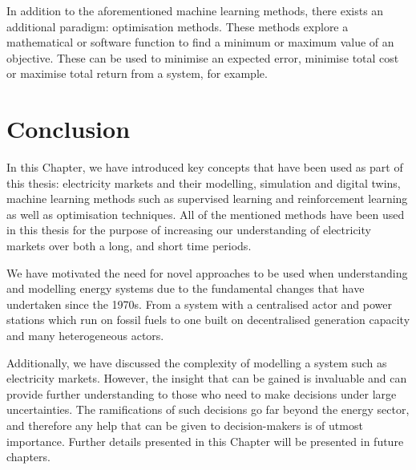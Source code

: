In addition to the aforementioned machine learning methods, there exists an additional paradigm: optimisation methods. These methods explore a mathematical or software function to find a minimum or maximum value of an objective. These can be used to minimise an expected error, minimise total cost or maximise total return from a system, for example.





\section{Conclusion}
\label{sec:intro:conclusion}

In this Chapter, we have introduced key concepts that have been used as part of this thesis: electricity markets and their modelling, simulation and digital twins, machine learning methods such as supervised learning and reinforcement learning as well as optimisation techniques. All of the mentioned methods have been used in this thesis for the purpose of increasing our understanding of electricity markets over both a long, and short time periods.

We have motivated the need for novel approaches to be used when understanding and modelling energy systems due to the fundamental changes that have undertaken since the 1970s. From a system with a centralised actor and power stations which run on fossil fuels to one built on decentralised generation capacity and many heterogeneous actors. 

Additionally, we have discussed the complexity of modelling a system such as electricity markets. However, the insight that can be gained is invaluable and can provide further understanding to those who need to make decisions under large uncertainties. The ramifications of such decisions go far beyond the energy sector, and therefore any help that can be given to decision-makers is of utmost importance. Further details presented in this Chapter will be presented in future chapters.


